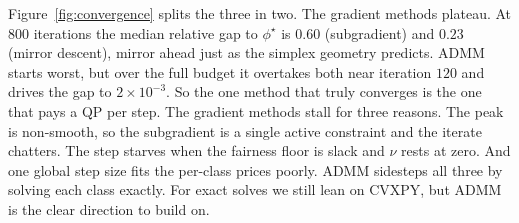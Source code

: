 Figure~\ref{fig:convergence} splits the three in two. The gradient methods plateau.
At $800$ iterations the median relative gap to $\phi^\star$ is $0.60$ (subgradient)
and $0.23$ (mirror descent), mirror ahead just as the simplex geometry predicts.
ADMM starts worst, but over the full budget it overtakes both near iteration $120$
and drives the gap to $2\times10^{-3}$. So the one method that truly converges is the
one that pays a QP per step. The gradient methods stall for three reasons. The peak
is non-smooth, so the subgradient is a single active constraint and the iterate
chatters. The step starves when the fairness floor is slack and $\nu$ rests at zero.
And one global step size fits the per-class prices poorly. ADMM sidesteps all three
by solving each class exactly. For exact solves we still lean on CVXPY, but ADMM is
the clear direction to build on.

